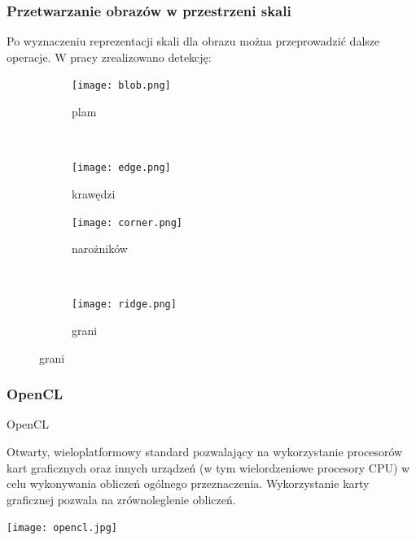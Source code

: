 \begin{frame}
	\frametitle{Przetwarzanie obrazów w przestrzeni skali}

	Po wyznaczeniu reprezentacji skali dla obrazu można przeprowadzić dalsze operacje. W pracy zrealizowano detekcję:	
	\begin{figure}[h]
		\begin{center}
			\begin{subfigure}[b]{5cm}
				\centering
				\texttt{[image: blob.png]}
				\caption{plam}
			\end{subfigure}
			~
			\begin{subfigure}[b]{5cm}
				\centering
				\texttt{[image: edge.png]}
				\caption{krawędzi}
			\end{subfigure}

			\begin{subfigure}[b]{5cm}
				\centering
				\texttt{[image: corner.png]}
				\caption{narożników}
			\end{subfigure}
			~
			\begin{subfigure}[b]{5cm}
				\centering
				\texttt{[image: ridge.png]}
				\caption{grani}
			\end{subfigure}
		\end{center}
		\label{fig:asss}
	\end{figure}
\end{frame}

\begin{frame}
	\frametitle{OpenCL}
	\begin{block}{OpenCL}
	\begin{tiny}
		Otwarty, wieloplatformowy standard pozwalający na wykorzystanie procesorów kart graficznych oraz innych urządzeń (w tym wielordzeniowe procesory CPU) w celu wykonywania obliczeń ogólnego przeznaczenia. Wykorzystanie karty graficznej pozwala na zrównoleglenie obliczeń.
	\end{tiny}
	\end{block}
	\begin{center}
	\texttt{[image: opencl.jpg]}
	\end{center}
\end{frame}


